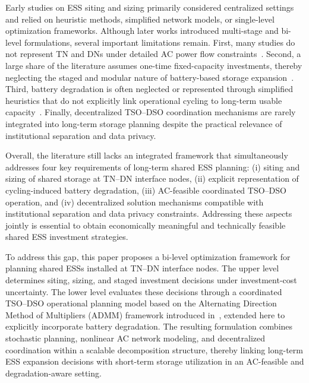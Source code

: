 \documentclass[preprint,12pt]{elsarticle}
\begin{document}
Early studies on ESS siting and sizing primarily considered centralized settings and relied on heuristic methods, simplified network models, or single-level optimization frameworks. Although later works introduced multi-stage and bi-level formulations, several important limitations remain. 
First, many studies do not represent TN and DNs under detailed AC power flow constraints~\cite{massucco_2021,hassan_2018,feng_2025,najibi_2021,nawaz_2021,papalexopoulos_2020,bragin_2022,qiu_2017}. 
Second, a large share of the literature assumes one-time fixed-capacity investments, thereby neglecting the staged and modular nature of battery-based storage expansion~\cite{pandzic_2015,liu_2016,li_2015,bayram_2017,zhang_2013,hedayati_2014,konstantelos_2015}. 
Third, battery degradation is often neglected or represented through simplified heuristics that do not explicitly link operational cycling to long-term usable capacity~\cite{liu_2016,li_2015,bayram_2017,zhang_2013,hedayati_2014,konstantelos_2015,nasrolahpour_2016,xu_2017,motalleb_2016,feng_2025,pandzic_2015,fortenbacher_2016,nick_2018}. 
Finally, decentralized TSO--DSO coordination mechanisms are rarely integrated into long-term storage planning despite the practical relevance of institutional separation and data privacy.

Overall, the literature still lacks an integrated framework that simultaneously addresses four key requirements of long-term shared ESS planning: 
(i) siting and sizing of shared storage at TN--DN interface nodes, 
(ii) explicit representation of cycling-induced battery degradation, 
(iii) AC-feasible coordinated TSO--DSO operation, and 
(iv) decentralized solution mechanisms compatible with institutional separation and data privacy constraints. 
Addressing these aspects jointly is essential to obtain economically meaningful and technically feasible shared ESS investment strategies.

To address this gap, this paper proposes a bi-level optimization framework for planning shared ESSs installed at TN--DN interface nodes. The upper level determines siting, sizing, and staged investment decisions under investment-cost uncertainty. The lower level evaluates these decisions through a coordinated TSO--DSO operational planning model based on the Alternating Direction Method of Multipliers (ADMM) framework introduced in~\cite{simoes_2023}, extended here to explicitly incorporate battery degradation. The resulting formulation combines stochastic planning, nonlinear AC network modeling, and decentralized coordination within a scalable decomposition structure, thereby linking long-term ESS expansion decisions with short-term storage utilization in an AC-feasible and degradation-aware setting.
\end{document}
